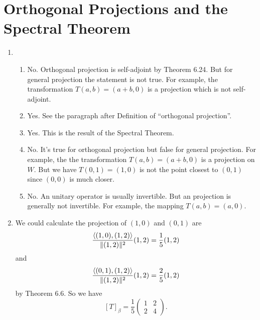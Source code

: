 \section{Orthogonal Projections and the Spectral Theorem}
\begin{enumerate}
\item \begin{enumerate}
\item No. Orthogonal projection is self-adjoint by Theorem 6.24. But for general projection the statement is not true. For example, the transformation $T(a,b)=(a+b,0)$ is a projection which is not self-adjoint.
\item Yes. See the paragraph after Definition of ``orthogonal projection''.
\item Yes. This is the result of the Spectral Theorem.
\item No. It's true for orthogonal projection but false for general projection. For example, the the transformation $T(a,b)=(a+b,0)$ is a projection on $W$. But we have $T(0,1)=(1,0)$ is not the point closest to $(0,1)$ since $(0,0)$ is much closer.
\item No. An unitary operator is usually invertible. But an projection is generally not invertible. For example, the mapping $T(a,b)=(a,0)$.
\end{enumerate}
\item We could calculate the projection of $(1,0)$ and $(0,1)$ are  
\[\frac{\langle (1,0),(1,2)\rangle }{\|(1,2)\|^2}(1,2)=\frac{1}{5}(1,2)\]
and 
\[\frac{\langle (0,1),(1,2)\rangle }{\|(1,2)\|^2}(1,2)=\frac{2}{5}(1,2)\]
by Theorem 6.6. So we have 
\[[T]_{\beta}=\frac{1}{5}\begin{pmatrix}1&2\\2&4\end{pmatrix}.\]


\end{enumerate}
